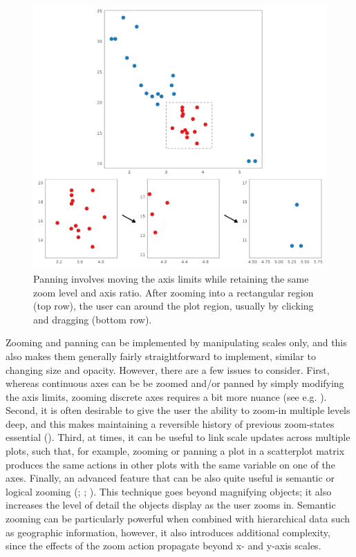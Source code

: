 \documentclass[
]{book}
\theoremstyle{definition}
\theoremstyle{definition}
\theoremstyle{definition}
\theoremstyle{definition}
\theoremstyle{remark}
\begin{document}
\begin{figure}

{\centering \includegraphics[width=1\linewidth,height=1\textheight]{./figures/panning} 

}

\caption{Panning involves moving the axis limits while retaining the same zoom level and axis ratio. After zooming into a rectangular region (top row), the user can around the plot region, usually by clicking and dragging (bottom row).}\label{fig:panning}
\end{figure}

Zooming and panning can be implemented by manipulating scales only, and this also makes them generally fairly straightforward to implement, similar to changing size and opacity. However, there are a few issues to consider. First, whereas continuous axes can be be zoomed and/or panned by simply modifying the axis limits, zooming discrete axes requires a bit more nuance (see e.g. ). Second, it is often desirable to give the user the ability to zoom-in multiple levels deep, and this makes maintaining a reversible history of previous zoom-states essential (). Third, at times, it can be useful to link scale updates across multiple plots, such that, for example, zooming or panning a plot in a scatterplot matrix produces the same actions in other plots with the same variable on one of the axes. Finally, an advanced feature that can be also quite useful is semantic or logical zooming (; ; ). This technique goes beyond magnifying objects; it also increases the level of detail the objects display as the user zooms in. Semantic zooming can be particularly powerful when combined with hierarchical data such as geographic information, however, it also introduces additional complexity, since the effects of the zoom action propagate beyond x- and y-axis scales.
\end{document}
